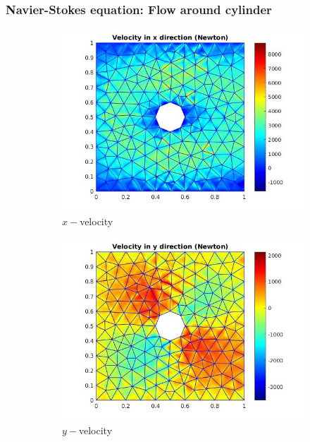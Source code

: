 \documentclass{beamer}
\begin{document}
\begin{frame}
\frametitle{Navier-Stokes equation: Flow around cylinder}
\begin{figure}
  \begin{subfigure}{0.3\textwidth}
    \includegraphics[width=\linewidth]{cylinder_newton_vx_minres.jpg}
    \caption{$x-$velocity}
  \label{x_vel_navier_stoke_minres}
  \end{subfigure}
  \begin{subfigure}{0.3\textwidth}
    \includegraphics[width=\linewidth]{cylinder_newton_vy_minres.jpg}
    \caption{$y-$velocity}
  \label{y_vel_navier_stoke_minres}
  \end{subfigure}
  \begin{subfigure}{0.3\textwidth}

\end{subfigure}
\end{figure}
\end{frame}
\end{document}
